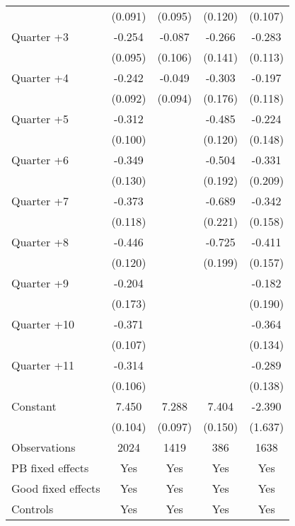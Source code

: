 \begin{tabular}{l*{4}{c}}
            &     (0.091)&     (0.095)&     (0.120)&     (0.107)\\
[1em]
Quarter +3  &      -0.254&      -0.087&      -0.266&      -0.283\\
            &     (0.095)&     (0.106)&     (0.141)&     (0.113)\\
[1em]
Quarter +4  &      -0.242&      -0.049&      -0.303&      -0.197\\
            &     (0.092)&     (0.094)&     (0.176)&     (0.118)\\
[1em]
Quarter +5  &      -0.312&            &      -0.485&      -0.224\\
            &     (0.100)&            &     (0.120)&     (0.148)\\
[1em]
Quarter +6  &      -0.349&            &      -0.504&      -0.331\\
            &     (0.130)&            &     (0.192)&     (0.209)\\
[1em]
Quarter +7  &      -0.373&            &      -0.689&      -0.342\\
            &     (0.118)&            &     (0.221)&     (0.158)\\
[1em]
Quarter +8  &      -0.446&            &      -0.725&      -0.411\\
            &     (0.120)&            &     (0.199)&     (0.157)\\
[1em]
Quarter +9  &      -0.204&            &            &      -0.182\\
            &     (0.173)&            &            &     (0.190)\\
[1em]
Quarter +10 &      -0.371&            &            &      -0.364\\
            &     (0.107)&            &            &     (0.134)\\
[1em]
Quarter +11 &      -0.314&            &            &      -0.289\\
            &     (0.106)&            &            &     (0.138)\\
[1em]
Constant    &       7.450&       7.288&       7.404&      -2.390\\
            &     (0.104)&     (0.097)&     (0.150)&     (1.637)\\
\hline
Observations&        2024&        1419&         386&        1638\\
PB fixed effects&         Yes&         Yes&         Yes&         Yes\\
Good fixed effects&         Yes&         Yes&         Yes&         Yes\\
Controls    &         Yes&         Yes&         Yes&         Yes\\
\hline\hline
\end{tabular}
